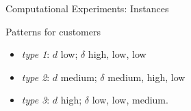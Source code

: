 \documentclass{beamer} %
\theoremstyle{definition} %
\begin{document}
\begin{frame}{Computational Experiments: Instances}
	\begin{table}[]
		\centering
		\caption{Instances parameters}
		\label{tab:instances}
	\end{table}
	\begin{block}{Patterns for customers}
		\begin{itemize}
			\item \textit{type 1}: $d$ low; $\delta$ high, low, low
			\item \textit{type 2}: $d$ medium; $\delta$ medium, high, low
			\item \textit{type 3}: $d$ high; $\delta$ low, low, medium.
		\end{itemize}
	\end{block}
\end{frame}
\end{document}
